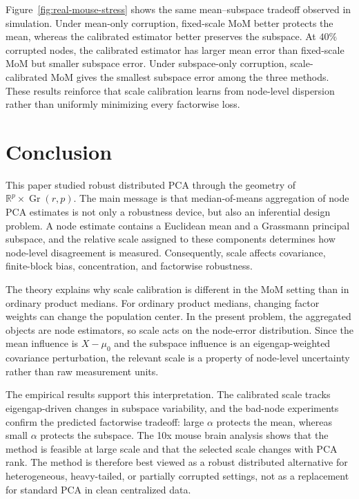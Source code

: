 \documentclass[11pt]{article}
\newcommand{\R}{\mathbb R}
\newcommand{\Gr}{\operatorname{Gr}}
\begin{document}
Figure~\ref{fig:real-mouse-stress} shows the same mean--subspace tradeoff
observed in simulation.  Under mean-only corruption, fixed-scale MoM better
protects the mean, whereas the calibrated estimator better preserves the
subspace.  At \(40\%\) corrupted nodes, the calibrated estimator has larger mean
error than fixed-scale MoM but smaller subspace error.  Under subspace-only
corruption, scale-calibrated MoM gives the smallest subspace error among the
three methods.  These results reinforce that scale calibration learns from
node-level dispersion rather than uniformly minimizing every factorwise loss.


\section{Conclusion}
\label{sec:conclusion}

This paper studied robust distributed PCA through the geometry of
\(\R^p\times\Gr(r,p)\).  The main message is that median-of-means aggregation of
node PCA estimates is not only a robustness device, but also an inferential
design problem.  A node estimate contains a Euclidean mean and a Grassmann
principal subspace, and the relative scale assigned to these components
determines how node-level disagreement is measured.  Consequently, scale affects
covariance, finite-block bias, concentration, and factorwise robustness.

The theory explains why scale calibration is different in the MoM setting than
in ordinary product medians.  For ordinary product medians, changing factor
weights can change the population center.  In the present problem, the
aggregated objects are node estimators, so scale acts on the node-error
distribution. Since the mean influence is \(X-\mu_0\) and the subspace influence is an eigengap-weighted covariance perturbation, the relevant scale is a property of
node-level uncertainty rather than raw measurement units.

The empirical results support this interpretation.  The calibrated scale tracks
eigengap-driven changes in subspace variability, and the bad-node experiments
confirm the predicted factorwise tradeoff: large \(\alpha\) protects the mean,
whereas small \(\alpha\) protects the subspace.  The 10x mouse brain analysis
shows that the method is feasible at large scale and that the selected scale
changes with PCA rank.  The method is therefore best viewed as a robust
distributed alternative for heterogeneous, heavy-tailed, or partially corrupted
settings, not as a replacement for standard PCA in clean centralized data.
\end{document}
